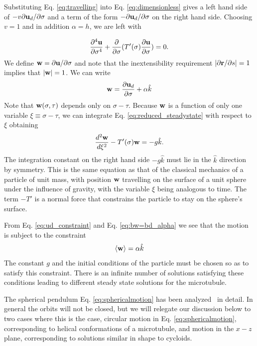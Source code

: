 \documentclass[11pt]{ucthesis}
\def\br{{\bf r}}
\def\bu{{\bf u}}
\def\bw{{\bf w}}
\begin{document}
{Substituting Eq. \ref{eq:travelling} into Eq. \ref{eq:dimensionless} gives a left hand side
of $-v \partial \bu_d/\partial \sigma$ and a term of the form $-\partial \bu_d/\partial \sigma$ on
the right hand side. Choosing $v = 1$ and in addition $\alpha = h$, we are left with

\begin{equation}
\label{eq:reduced_steadystate}
\frac{\partial^4 \bu}{\partial \sigma^4} + \frac{\partial}{\partial \sigma}(T'(\sigma)\frac{\partial \bu}{\partial \sigma}) = 0.
\end{equation}
We define $\bw = \partial \bu/\partial \sigma$  and
note that the inextensibility requirement $|\partial \br/\partial s| = 1$ implies that $|\bw| = 1$. We can write 
\begin{equation}
\label{eq:bw=bd_alpha}
\bw  = \frac{\partial \bu_d}{\partial \sigma} + \alpha {\hat k}
\end{equation}
Note that $\bw(\sigma,\tau)$ depends only on $\sigma -\tau$. Because $\bw$ is a function
of only one variable $\xi \equiv \sigma -\tau$, 
we can 
integrate Eq. \ref{eq:reduced_steadystate} with respect to $\xi$ obtaining
\begin{equation}
\label{eq:sphericalmotion}
\frac{d^2 \bw}{d \xi^2} - T'(\sigma)\bw = -g {\hat k}.
\end{equation}
The integration constant on the right hand side $-g {\hat k}$ must lie in the $\hat k$ direction by symmetry.
This is the same equation as that of the classical mechanics of a particle of unit mass, with position $\bw$ travelling on the surface of a 
unit sphere under the influence of gravity, with the variable $\xi$ being analogous to time. The term $-T'$ is a normal
force that constrains the particle to stay on the sphere's surface.

From Eq. \ref{eq:ud_constraint} and Eq. \ref{eq:bw=bd_alpha} we see that the motion is subject to the
constraint
\begin{equation}
\label{eq:alpha_constraint}
\langle \bw \rangle = \alpha {\hat k}
\end{equation}
The constant $g$ and the initial conditions of the particle must be chosen so as to satisfy this constraint.
There is an infinite number of solutions satisfying these conditions leading to different 
steady state solutions for the microtubule.

The spherical pendulum Eq. \ref{eq:sphericalmotion} has been analyzed~\cite{CushmanBates} in detail. In general
the orbits will not be closed, but we will relegate
our discussion below to two cases where this is the case, circular motion in Eq. \ref{eq:sphericalmotion}, corresponding to helical
conformations of a microtubule, and motion in the $x-z$ plane, corresponding to solutions similar in shape to cycloids.

}
\end{document}
